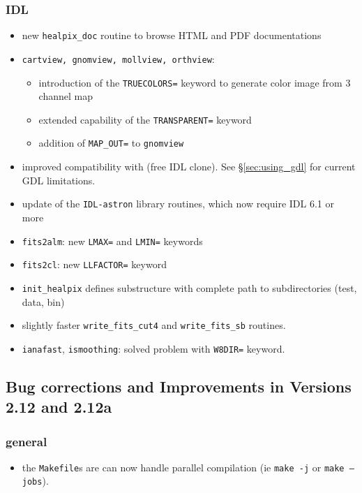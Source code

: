 \documentclass[12pt,twoside]{article}
\begin{document}
\subsubsection[IDL]{IDL}
	\begin{itemize}
	\item new {\tt healpix\_doc} routine to browse HTML and PDF documentations
	\item {\tt cartview, gnomview, mollview, orthview}:
        \begin{itemize}
		\item introduction of the {\tt TRUECOLORS=} keyword to generate color image from 3 channel map
		\item extended capability of the {\tt TRANSPARENT=} keyword
		\item addition of {\tt MAP\_OUT=} to {\tt gnomview}
	\end{itemize}
	\item improved compatibility with 
 (free IDL
clone). See \S\ref{sec:using_gdl} for current GDL limitations.
	\item update of the {\tt IDL-astron} library routines, which now require IDL 6.1 or more
	\item {\tt fits2alm}: new {\tt LMAX=} and {\tt LMIN=} keywords
	\item {\tt fits2cl}: new {\tt LLFACTOR=}  keyword
	\item {\tt init\_healpix} defines substructure with complete path to \healpix subdirectories (test, data, bin)
	\item slightly faster {\tt write\_fits\_cut4} and {\tt write\_fits\_sb} routines.
	\item {\tt ianafast}, {\tt ismoothing}: solved problem with {\tt W8DIR=} keyword.
	\end{itemize}

\subsection{Bug corrections and Improvements in Versions 2.12 and 2.12a} %
%
\subsubsection[New General Improvements]{general}
\begin{itemize}
	\item the {\tt Makefile}s are can now handle parallel compilation
(ie {\tt make -j} or {\tt make --jobs}).
\end{itemize}
\end{document}
